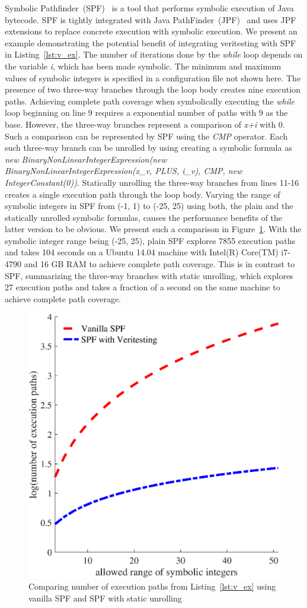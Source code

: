 Symbolic Pathfinder~(SPF)~\cite{spf} is a tool that performs symbolic execution of Java bytecode.
%
SPF is tightly integrated with Java PathFinder~(JPF)~\cite{jpf} and uses JPF extensions to replace concrete execution with symbolic execution. 
%
We present an example demonstrating the potential benefit of integrating veritesting with SPF in Listing~\ref{lst:v_ex}.
%
The number of iterations done by the \textit{while} loop depends on the variable \textit{i}, which has been made symbolic.
%
The minimum and maximum values of symbolic integers is specified in a configuration file not shown here.
%
The presence of two three-way branches through the loop body creates nine execution paths.
%
Achieving complete path coverage when symbolically executing the \textit{while} loop beginning on line 9 requires a exponential number of paths with 9 as the base.
%
However, the three-way branches represent a comparison of \textit{x+i} with 0. 
%
Such a comparison can be represented by SPF using the \textit{CMP} operator.
%
Each such three-way branch can be unrolled by using creating a symbolic formula as \textit{new BinaryNonLinearIntegerExpression(new BinaryNonLinearIntegerExpression(x\_v, PLUS, i\_v), CMP, new IntegerConstant(0))}.
%
Statically unrolling the three-way branches from lines 11-16 creates a single execution path through the loop body.
%
Varying the range of symbolic integers in SPF from (-1, 1) to (-25, 25) using both, the plain and the statically unrolled symbolic formulas, causes the performance benefits of the latter version to be obvious.
%
We present such a comparison in Figure~\ref{fig:v_ex_plot}.
%
With the symbolic integer range being (-25, 25), plain SPF explores 7855 execution paths and takes 104 seconds on a Ubuntu 14.04 machine with Intel(R) Core(TM) i7-4790 and 16 GB RAM to achieve complete path coverage.
%
This is in contrast to SPF, summarizing the three-way branches with static unrolling, which explores 27 execution paths and takes a fraction of a second on the same machine to achieve complete path coverage.

\begin{figure}[]
\caption{Comparing number of execution paths from Listing~\ref{lst:v_ex} using vanilla SPF and SPF with static unrolling}
\label{fig:v_ex_plot}
\includegraphics[width=\columnwidth]{figures/veritesting_example}
\end{figure}
%
